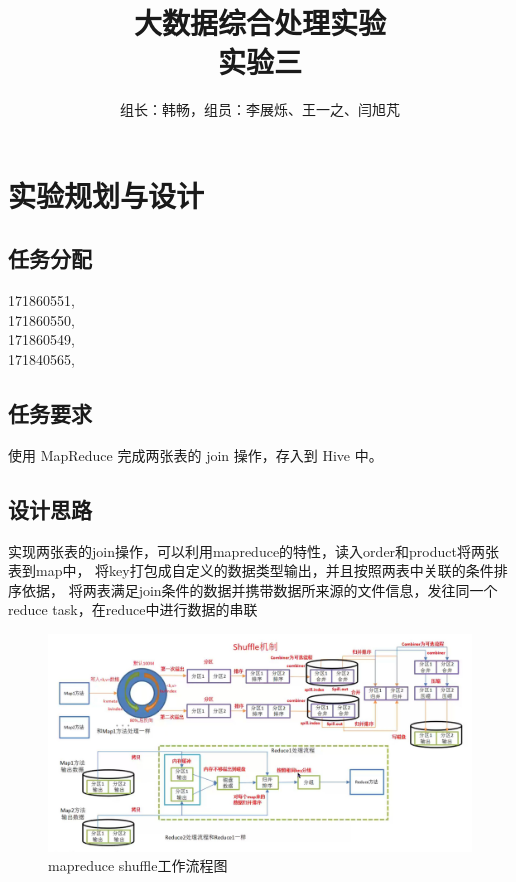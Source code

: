 \documentclass[a4paper,UTF8]{article}
\author{组长：韩畅，组员：李展烁、王一之、闫旭芃}
\numberwithin{equation}{section}
\begin{document}
{}
\title{大数据综合处理实验\\
实验三}
\maketitle

\section{实验规划与设计}
\subsection{任务分配}
{171860551, }\\ \indent
{171860550, }\\ \indent
{171860549, }\\ \indent
{171840565, }
\subsection{任务要求}
使用 MapReduce 完成两张表的 join 操作，存入到 Hive 中。
\subsection{设计思路}
实现两张表的join操作，可以利用mapreduce的特性，读入order和product将两张表到map中，
将key打包成自定义的数据类型输出，并且按照两表中关联的条件排序依据，
将两表满足join条件的数据并携带数据所来源的文件信息，发往同一个reduce task，在reduce中进行数据的串联
\begin{figure}[H]
    \centering

    \includegraphics[width = 15cm]{shuffle.png}

    \caption{mapreduce shuffle工作流程图}
\end{figure}
\end{document}
